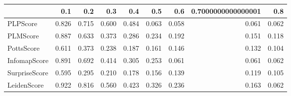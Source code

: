 \begin{tabular}{lrrrrrrrr}
\toprule
{} &   0.1 &   0.2 &   0.3 &   0.4 &   0.5 &   0.6 & 0.7000000000000001 &   0.8 \\
\midrule
PLPScore      & 0.826 & 0.715 & 0.600 & 0.484 & 0.063 & 0.058 &              0.061 & 0.062 \\
PLMScore      & 0.887 & 0.633 & 0.373 & 0.286 & 0.234 & 0.192 &              0.151 & 0.118 \\
PottsScore    & 0.611 & 0.373 & 0.238 & 0.187 & 0.161 & 0.146 &              0.132 & 0.104 \\
InfomapScore  & 0.891 & 0.692 & 0.414 & 0.305 & 0.253 & 0.061 &              0.061 & 0.062 \\
SurpriseScore & 0.595 & 0.295 & 0.210 & 0.178 & 0.156 & 0.139 &              0.119 & 0.105 \\
LeidenScore   & 0.922 & 0.816 & 0.560 & 0.423 & 0.326 & 0.236 &              0.163 & 0.062 \\
\bottomrule
\end{tabular}
